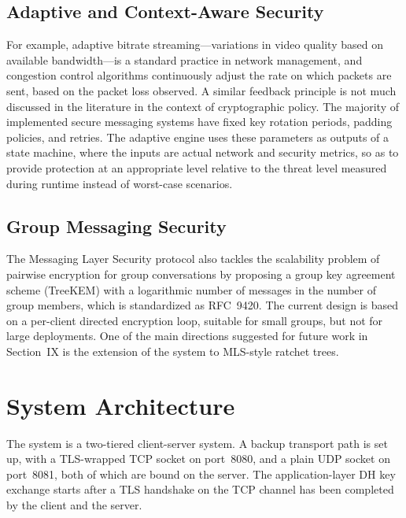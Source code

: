 \documentclass[conference]{IEEEtran}
\begin{document}
\subsection{Adaptive and Context-Aware Security}

For example, adaptive bitrate streaming—variations in video quality based on available bandwidth—is a standard practice in network management, and congestion control algorithms continuously adjust the rate on which packets are sent, based on the packet loss observed. A similar feedback principle is not much discussed in the literature in the context of cryptographic policy. The majority of implemented secure messaging systems have fixed key rotation periods, padding policies, and retries. The adaptive engine uses these parameters as outputs of a state machine, where the inputs are actual network and security metrics, so as to provide protection at an appropriate level relative to the threat level measured during runtime instead of worst-case scenarios.

\subsection{Group Messaging Security}

The Messaging Layer Security protocol \cite{b5} also tackles the scalability problem of pairwise encryption for group conversations by proposing a group key agreement scheme (TreeKEM) with a logarithmic number of messages in the number of group members, which is standardized as RFC~9420. The current design is based on a per-client directed encryption loop, suitable for small groups, but not for large deployments. One of the main directions suggested for future work in Section~IX is the extension of the system to MLS-style ratchet trees.

\section{System Architecture}

The system is a two-tiered client-server system. A backup transport path is set up, with a TLS-wrapped TCP socket on port~8080, and a plain UDP socket on port~8081, both of which are bound on the server. The application-layer DH key exchange starts after a TLS handshake on the TCP channel has been completed by the client and the server.
\end{document}
